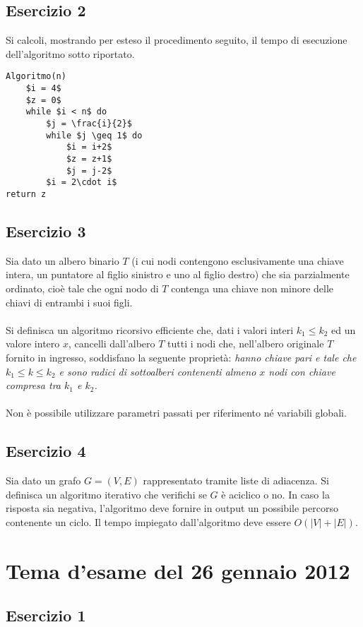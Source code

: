 \documentclass[11pt,a4paper,oneside]{article}
\begin{document}
\subsection*{Esercizio 2} Si calcoli, mostrando per esteso il procedimento seguito, il tempo di esecuzione dell'algoritmo sotto riportato.

\begin{lstlisting}[mathescape=true]
Algoritmo(n)
	$i = 4$
	$z = 0$
	while $i < n$ do
		$j = \frac{i}{2}$
		while $j \geq 1$ do
			$i = i+2$
			$z = z+1$
			$j = j-2$
		$i = 2\cdot i$
return z
\end{lstlisting}
\subsection*{Esercizio 3} Sia dato un albero binario $T$ (i cui nodi contengono esclusivamente una chiave intera, un puntatore al figlio sinistro e uno al figlio destro) che sia parzialmente ordinato, cioè tale che ogni nodo di $T$ contenga una chiave non minore delle chiavi di entrambi i suoi figli.\\\\Si definisca un algoritmo ricorsivo efficiente che, dati i valori interi $k_1 \leq k_2$ ed un valore intero $x$, cancelli dall'albero $T$ tutti i nodi che, nell'albero originale $T$ fornito in ingresso, soddisfano la seguente proprietà: \textit{hanno chiave pari e tale che $k_1 \leq k \leq k_2$ e sono radici di sottoalberi contenenti almeno $x$ nodi con chiave compresa tra $k_1$ e $k_2$.}\\\\Non è possibile utilizzare parametri passati per riferimento né variabili globali.
\subsection*{Esercizio 4} Sia dato un grafo $G=(V,E)$ rappresentato tramite liste di adiacenza. Si definisca un algoritmo iterativo che verifichi se $G$ è aciclico o no. In caso la risposta sia negativa, l'algoritmo deve fornire in output un possibile percorso contenente un ciclo. Il tempo impiegato dall'algoritmo deve essere $O(|V|+|E|)$.
\pagebreak
%
%
\section*{Tema d'esame del 26 gennaio 2012}
\subsection*{Esercizio 1}
\end{document}
